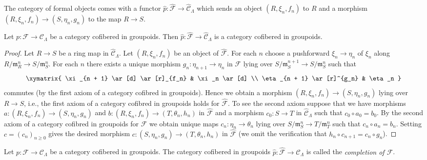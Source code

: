 \noindent
The category of formal objects comes with a functor $\widehat{p}:
\widehat{\mathcal{F}} \to \widehat{\mathcal{C}}_\Lambda$ which sends an
object $(R, \xi_n, f_n)$ to $R$ and a morphism
$(R, \xi_n, f_n) \to (S, \eta_n, g_n)$ to the map $R \to S$.

\begin{lemma}
\label{lemma-completion-cofibred}
Let $p : \mathcal{F} \to \mathcal{C}_\Lambda$ be a category cofibered in
groupoids. Then
$\widehat{p} : \widehat{\mathcal{F}} \to \widehat{\mathcal{C}}_\Lambda$
is a category cofibered in groupoids.
\end{lemma}

\begin{proof}
Let $R \to S$ be a ring map in $\widehat{\mathcal{C}}_\Lambda$.
Let $(R, \xi_n, f_n)$ be an object of $\widehat{\mathcal{F}}$.
For each $n$ choose a pushforward $\xi_n \to \eta_n$ of $\xi_n$
along $R/\mathfrak m_R^n \to S/\mathfrak m_S^n$. For each $n$ there
exists a unique morphism $g_n : \eta_{n + 1} \to \eta_n$ in $\mathcal{F}$
lying over $S/\mathfrak m_S^{n + 1} \to S/\mathfrak m_S^n$ such that
$$
\xymatrix{
\xi_{n + 1} \ar[d] \ar[r]_{f_n} & \xi_n \ar[d] \\
\eta_{n + 1} \ar[r]^{g_n} & \eta_n
}
$$
commutes (by the first axiom of a category cofibred in groupoids).
Hence we obtain a morphism $(R, \xi_n, f_n) \to (S, \eta_n, g_n)$
lying over $R \to S$, i.e., the first axiom of a category cofibred in
groupoids holds for $\widehat{\mathcal{F}}$. To see the second axiom
suppose that we have morphisms
$a : (R, \xi_n, f_n) \to (S, \eta_n, g_n)$ and
$b : (R, \xi_n, f_n) \to (T, \theta_n, h_n)$ in $\widehat{\mathcal{F}}$
and a morphism $c_0 : S \to T$ in $\widehat{\mathcal{C}}_\Lambda$ such that
$c_0 \circ a_0 = b_0$. By the second axiom of a category cofibred in groupoids
for $\mathcal{F}$ we obtain unique maps $c_n : \eta_n \to \theta_n$
lying over $S/\mathfrak m_S^n \to T/\mathfrak m_T^n$ such that
$c_n \circ a_n = b_n$. Setting $c = (c_n)_{n \geq 0}$ gives the desired
morphism $c : (S, \eta_n, g_n) \to (T, \theta_n, h_n)$ in
$\widehat{\mathcal{F}}$ (we omit the verification that
$h_n \circ c_{n + 1} = c_n \circ g_n$).
\end{proof}

\begin{definition}
\label{definition-completion}
Let $p : \mathcal{F} \to \mathcal{C}_\Lambda$ be a category cofibered in
groupoids. The category cofibered in groupoids
$\widehat{p} : \widehat{\mathcal  F} \to \widehat{\mathcal{C}}_\Lambda$
is called the {\it completion of $\mathcal{F}$}.
\end{definition}

